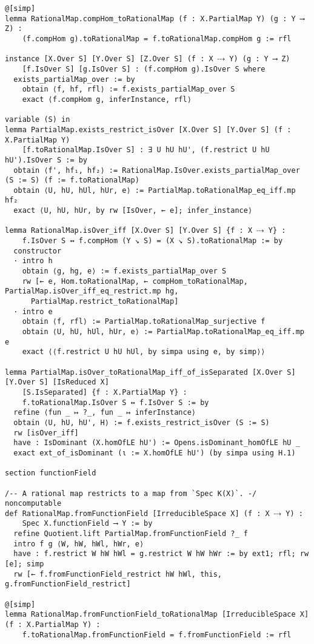 \documentclass{article}
\begin{document}
\begin{lstlisting}[language=Lean, caption={RationalMap.lean}]
@[simp]
lemma RationalMap.compHom_toRationalMap (f : X.PartialMap Y) (g : Y ⟶ Z) :
    (f.compHom g).toRationalMap = f.toRationalMap.compHom g := rfl

instance [X.Over S] [Y.Over S] [Z.Over S] (f : X ⤏ Y) (g : Y ⟶ Z)
    [f.IsOver S] [g.IsOver S] : (f.compHom g).IsOver S where
  exists_partialMap_over := by
    obtain ⟨f, hf, rfl⟩ := f.exists_partialMap_over S
    exact ⟨f.compHom g, inferInstance, rfl⟩

variable (S) in
lemma PartialMap.exists_restrict_isOver [X.Over S] [Y.Over S] (f : X.PartialMap Y)
    [f.toRationalMap.IsOver S] : ∃ U hU hU', (f.restrict U hU hU').IsOver S := by
  obtain ⟨f', hf₁, hf₂⟩ := RationalMap.IsOver.exists_partialMap_over (S := S) (f := f.toRationalMap)
  obtain ⟨U, hU, hUl, hUr, e⟩ := PartialMap.toRationalMap_eq_iff.mp hf₂
  exact ⟨U, hU, hUr, by rw [IsOver, ← e]; infer_instance⟩

lemma RationalMap.isOver_iff [X.Over S] [Y.Over S] {f : X ⤏ Y} :
    f.IsOver S ↔ f.compHom (Y ↘ S) = (X ↘ S).toRationalMap := by
  constructor
  · intro h
    obtain ⟨g, hg, e⟩ := f.exists_partialMap_over S
    rw [← e, Hom.toRationalMap, ← compHom_toRationalMap, PartialMap.isOver_iff_eq_restrict.mp hg,
      PartialMap.restrict_toRationalMap]
  · intro e
    obtain ⟨f, rfl⟩ := PartialMap.toRationalMap_surjective f
    obtain ⟨U, hU, hUl, hUr, e⟩ := PartialMap.toRationalMap_eq_iff.mp e
    exact ⟨⟨f.restrict U hU hUl, by simpa using e, by simp⟩⟩

lemma PartialMap.isOver_toRationalMap_iff_of_isSeparated [X.Over S] [Y.Over S] [IsReduced X]
    [S.IsSeparated] {f : X.PartialMap Y} :
    f.toRationalMap.IsOver S ↔ f.IsOver S := by
  refine ⟨fun _ ↦ ?_, fun _ ↦ inferInstance⟩
  obtain ⟨U, hU, hU', H⟩ := f.exists_restrict_isOver (S := S)
  rw [isOver_iff]
  have : IsDominant (X.homOfLE hU') := Opens.isDominant_homOfLE hU _
  exact ext_of_isDominant (ι := X.homOfLE hU') (by simpa using H.1)

section functionField

/-- A rational map restricts to a map from `Spec K(X)`. -/
noncomputable
def RationalMap.fromFunctionField [IrreducibleSpace X] (f : X ⤏ Y) :
    Spec X.functionField ⟶ Y := by
  refine Quotient.lift PartialMap.fromFunctionField ?_ f
  intro f g ⟨W, hW, hWl, hWr, e⟩
  have : f.restrict W hW hWl = g.restrict W hW hWr := by ext1; rfl; rw [e]; simp
  rw [← f.fromFunctionField_restrict hW hWl, this, g.fromFunctionField_restrict]

@[simp]
lemma RationalMap.fromFunctionField_toRationalMap [IrreducibleSpace X] (f : X.PartialMap Y) :
    f.toRationalMap.fromFunctionField = f.fromFunctionField := rfl


\end{lstlisting}
\end{document}
